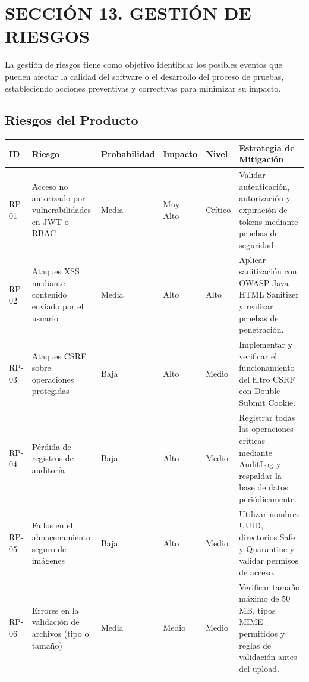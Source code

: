 ﻿\section{SECCIÓN 13. GESTIÓN DE RIESGOS}
La gestión de riesgos tiene como objetivo identificar los posibles eventos que pueden afectar la calidad del software o el desarrollo del proceso de pruebas, estableciendo acciones preventivas y correctivas para minimizar su impacto.

\subsection*{Riesgos del Producto}
\begin{longtable}{|p{1.5cm}|p{5cm}|p{2.5cm}|p{2.5cm}|p{2cm}|p{4cm}|}
\hline
\textbf{ID} & \textbf{Riesgo} & \textbf{Probabilidad} & \textbf{Impacto} & \textbf{Nivel} & \textbf{Estrategia de Mitigación} \\
\hline
RP-01 & Acceso no autorizado por vulnerabilidades en JWT o RBAC & Media & Muy Alto & Crítico & Validar autenticación, autorización y expiración de tokens mediante pruebas de seguridad. \\
\hline
RP-02 & Ataques XSS mediante contenido enviado por el usuario & Media & Alto & Alto & Aplicar sanitización con OWASP Java HTML Sanitizer y realizar pruebas de penetración. \\
\hline
RP-03 & Ataques CSRF sobre operaciones protegidas & Baja & Alto & Medio & Implementar y verificar el funcionamiento del filtro CSRF con Double Submit Cookie. \\
\hline
RP-04 & Pérdida de registros de auditoría & Baja & Alto & Medio & Registrar todas las operaciones críticas mediante AuditLog y respaldar la base de datos periódicamente. \\
\hline
RP-05 & Fallos en el almacenamiento seguro de imágenes & Baja & Alto & Medio & Utilizar nombres UUID, directorios Safe y Quarantine y validar permisos de acceso. \\
\hline
RP-06 & Errores en la validación de archivos (tipo o tamaño) & Media & Medio & Medio & Verificar tamaño máximo de 50 MB, tipos MIME permitidos y reglas de validación antes del upload. \\
\hline
\end{longtable}

